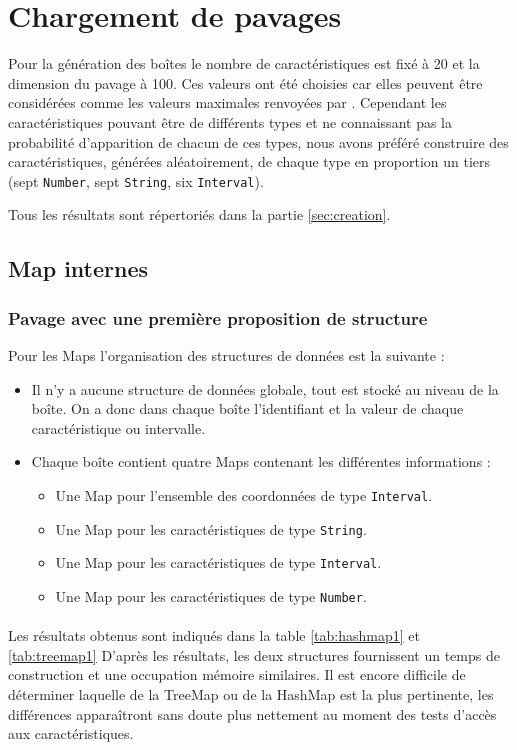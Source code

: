 \section{Chargement de pavages}
\label{chap:Chargement}
Pour la génération des boîtes le nombre de caractéristiques est fixé à 20 et la dimension du pavage à 100. Ces valeurs ont été choisies car elles peuvent être considérées comme les valeurs maximales renvoyées par \realpaver. Cependant les caractéristiques pouvant être de différents types et ne connaissant pas la probabilité d'apparition de chacun de ces types, nous avons préféré construire des caractéristiques, générées aléatoirement, de chaque type en proportion un tiers (sept \verb+Number+, sept \verb+String+, six \verb+Interval+). 

Tous les résultats sont répertoriés dans la partie \ref{sec:creation}.

\subsection{Map internes}

\subsubsection{Pavage avec une première proposition de structure}
Pour les Maps l'organisation des structures de données est la suivante :
\begin{itemize}
\item Il n'y a aucune structure de données globale, tout est stocké au niveau de la boîte. On a donc dans chaque boîte l'identifiant et la valeur de chaque caractéristique ou intervalle.
 \item Chaque boîte contient quatre Maps contenant les différentes informations :
\begin{itemize}
 \item Une Map pour l'ensemble des coordonnées de type \verb+Interval+.
\item Une Map pour les caractéristiques de type \verb+String+.
\item Une Map pour les caractéristiques de type \verb+Interval+.
\item Une Map pour les caractéristiques de type \verb+Number+.
\end{itemize}
\end{itemize}

\paragraph{}Les résultats obtenus sont indiqués dans la table \ref{tab:hashmap1} et \ref{tab:treemap1}
D'après les résultats, les deux structures fournissent un temps de construction et une occupation mémoire similaires.
Il est encore difficile de déterminer laquelle de la TreeMap ou de la HashMap est la plus pertinente, les différences apparaîtront sans doute plus nettement au moment des tests d'accès aux caractéristiques. 


